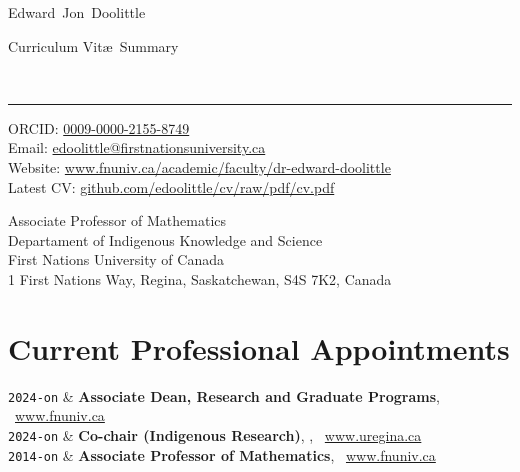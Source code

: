 \documentclass[9pt,a4paper]{article}
\makeatletter
\newcommand{\FNUniv}{First Nations University of Canada}
\newcommand{\UofR}{University of Regina}
\newcommand{\Title}{Curriculum Vit\ae\ Summary}
\newcommand{\FirstName}{Edward}
\newcommand{\MiddleName}{Jon}
\newcommand{\LastName}{Doolittle}
\newcommand{\MyName}{\FirstName\ \MiddleName\ \LastName}
\newcommand{\Email}{edoolittle@firstnationsuniversity.ca}
\newcommand{\PersonalWebsite}{www.fnuniv.ca/academic/faculty/dr-edward-doolittle}
\newcommand{\LabWebsite}{www.fnuniv.ca}
\newcommand{\ORCID}{0009-0000-2155-8749}
\newcommand{\Duration}[2]{\fontsize{10pt}{0}\selectfont \texttt{#1-#2}}
\newcommand{\Ongoing}{on}
\newcommand{\Website}[1]{\href{https://#1}{#1}}
\newcommand{\MYhref}[3][darkblue]{\href{#2}{\color{#1}{#3}}}
\makeatother
\begin{document}
\begin{minipage}[t]{0.5\textwidth}
  {\fontsize{20pt}{0}\selectfont\MyName}
\end{minipage}
\begin{minipage}[t]{0.5\textwidth}
  \begin{flushright}
    \Title{}
  \end{flushright}
\end{minipage}
\\[-0.1cm]
\textcolor{lightgray}{\rule{\textwidth}{3pt}}
\begin{minipage}[t]{0.45\textwidth}
  ORCID: \href{https://orcid.org/\ORCID}{\ORCID}
  \\
  Email: \href{mailto:\Email}{\Email}
  \\
  Website: \Website{\PersonalWebsite}
  \\
  Latest CV: \Website{github.com/edoolittle/cv/raw/pdf/cv.pdf}
\end{minipage}
\begin{minipage}[t]{0.55\textwidth}
  \begin{flushright}
  Associate Professor of Mathematics
  \\
  Departament of Indigenous Knowledge and Science
  \\
  First Nations University of Canada
  \\
  1 First Nations Way, Regina, Saskatchewan, S4S 7K2, Canada
  \end{flushright}
\end{minipage}
\vspace{0.3cm}

\section{Current Professional Appointments}

\begin{EntriesTableDuration}
  \Duration{2024}{\Ongoing} & \textbf{Associate Dean, Research and
    Graduate Programs}, \MYhref{https://www.fnuniv.ca}{\FNUniv}\
  \Website{www.fnuniv.ca} %
  \\ %
  \Duration{2024}{\Ongoing} & \textbf{Co-chair (Indigenous Research)},
  \MYhref{https://www.uregina.ca/research/office-research-services/human-research/index.html}{Research
    Ethics Board}, \MYhref{https://www.uregina.ca}{\UofR}\
  \Website{www.uregina.ca} %
  \\ %
  \Duration{2014}{\Ongoing} & \textbf{Associate Professor of
    Mathematics}, \MYhref{https://www.fnuniv.ca}{\FNUniv}\
  \Website{www.fnuniv.ca} %
\end{EntriesTableDuration}
\end{document}
